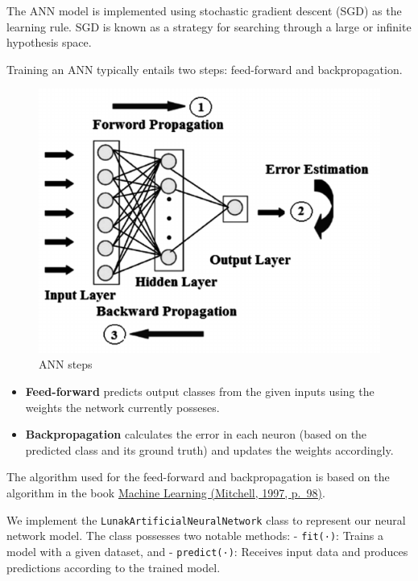 \documentclass[11pt]{article}
\makeatletter
\def\maxwidth{\ifdim\Gin@nat@width>\linewidth\linewidth
    \else\Gin@nat@width\fi}
\let\Oldincludegraphics\includegraphics
\renewcommand{\includegraphics}[1]{\Oldincludegraphics[width=.8\maxwidth]{#1}}
\providecommand{\tightlist}{%
      \setlength{\itemsep}{0pt}\setlength{\parskip}{0pt}}
\makeatother
\begin{document}
    The ANN model is implemented using stochastic gradient descent (SGD) as
the learning rule. SGD is known as a strategy for searching through a
large or infinite hypothesis space.

Training an ANN typically entails two steps: feed-forward and
backpropagation.

\begin{figure}
\centering
\includegraphics{img/Back-propagation-multilayer-ANN-with-one-hidden-layer.png}
\caption{ANN steps}
\end{figure}

\begin{itemize}
\tightlist
\item
  \textbf{Feed-forward} predicts output classes from the given inputs
  using the weights the network currently posseses.
\item
  \textbf{Backpropagation} calculates the error in each neuron (based on
  the predicted class and its ground truth) and updates the weights
  accordingly.
\end{itemize}

The algorithm used for the feed-forward and backpropagation is based on
the algorithm in the book
\href{https://www.cs.ubbcluj.ro/~gabis/ml/ml-books/McGrawHill\%20-\%20Machine\%20Learning\%20-Tom\%20Mitchell.pdf}{Machine
Learning (Mitchell, 1997, p.~98)}.

    We implement the \texttt{LunakArtificialNeuralNetwork} class to
represent our neural network model. The class possesses two notable
methods: - \texttt{fit(·)}: Trains a model with a given dataset, and -
\texttt{predict(·)}: Receives input data and produces predictions
according to the trained model.
\end{document}
